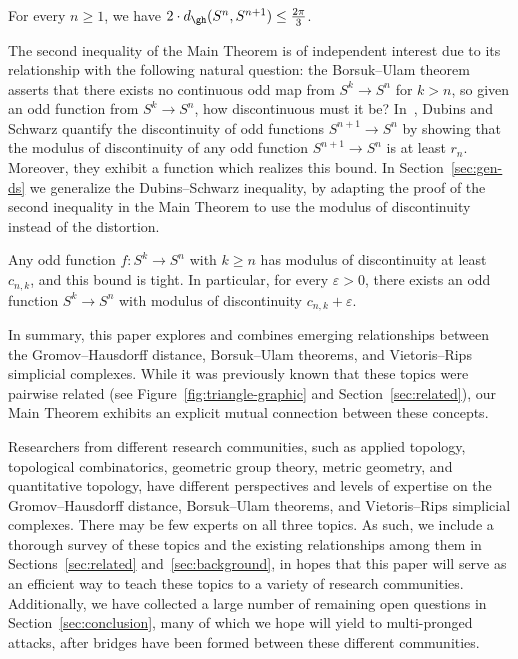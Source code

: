 \documentclass[11pt, reqno, english]{amsart}
\begin{document}
\begin{theorem}
\label{thm:super-diag-upper-bound}
For every $n\ge 1$, we have $2\cdot d_{\gh}(S^n, S^{n+1}) \le \frac{2\pi}{3}$.
\end{theorem}

The second inequality of the Main Theorem is of independent interest due to its relationship with the following natural question: the Borsuk--Ulam theorem asserts that there exists no continuous odd map from $S^k \to S^n$ for $k > n$, so given an odd function from $S^k \to S^n$, how discontinuous must it be?
In~\cite{dubins1981equidiscontinuity}, Dubins and Schwarz quantify the discontinuity of odd functions $S^{n+1} \to S^n$ by showing that the modulus of discontinuity of any odd function $S^{n+1}\to S^n$ is at least $r_n$.
Moreover, they exhibit a function which realizes this bound.
In Section~\ref{sec:gen-ds} we generalize the Dubins--Schwarz inequality, by adapting the proof of the second inequality in the Main Theorem to use the modulus of discontinuity instead of the distortion.

\begin{theorem}
\label{thm:odd-modulus-discontinuity-bound}
Any odd function $f\colon S^k \to S^n$ with $k \ge n$ has modulus of discontinuity at least $c_{n,k}$, and this bound is tight.
In particular, for every $\varepsilon > 0$, there exists an odd function $S^k \to S^n$ with modulus of discontinuity $c_{n,k} + \varepsilon$.
\end{theorem}

In summary, this paper explores and combines emerging relationships between the Gromov--Hausdorff distance, Borsuk--Ulam theorems, and Vietoris--Rips simplicial complexes.
While it was previously known that these topics were pairwise related (see Figure~\ref{fig:triangle-graphic} and Section~\ref{sec:related}), our Main Theorem exhibits an explicit mutual connection between these concepts.

Researchers from different research communities, such as applied topology, topological combinatorics, geometric group theory, metric geometry, and quantitative topology, have different perspectives and levels of expertise on the Gromov--Hausdorff distance, Borsuk--Ulam theorems, and Vietoris--Rips simplicial complexes.
There may be few experts on all three topics.
As such, we include a thorough survey of these topics and the existing relationships among them in Sections~\ref{sec:related} and~\ref{sec:background},  in hopes that this paper will serve as an efficient way to teach these topics to a variety of research communities.
Additionally, we have collected a large number of remaining open questions in Section~\ref{sec:conclusion}, many of which we hope will yield to multi-pronged attacks, after bridges have been formed between these different communities.
\end{document}
